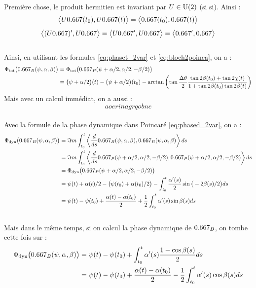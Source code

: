 Première chose, le produit hermitien est invariant par $U\in\text{\normalfont U}(2)$ (si si). Ainsi :
\[\big\langle U\x(t_0), U\x(t) \big\rangle = \big\langle \x(t_0), \x(t) \big\rangle\]
\[\big\langle (U\x)', U\x \big\rangle = \big\langle U\x', U\x \big\rangle = \big\langle \x', \x \big\rangle\]
\\
Ainsi, en utilisant les formules \eqref{eq:phaset_2var} et \eqref{eq:bloch2poinca}, on a :
\begin{align*}\phaset \big(\x_B(\psi, \alpha, \beta) \big) &= \phaset \big(\x_P(\psi + \alpha/2, \alpha/2, -\beta/2) \big) \\
	&= \big( \psi + \alpha/2 \big)(t) - \big( \psi + \alpha/2 \big)(t_0) - \arctan\left( \tan \frac{\Delta\theta}{2} \frac{ \tan 2\beta(t_0)+\tan 2\chi(t)}{1 + \tan 2\beta(t_0)\tan 2\beta(t)}\right)
\end{align*}
Mais avec un calcul immédiat, on a aussi :
\[aoerinagrqobne\]
\\
Avec la formule de la phase dynamique dans Poincaré \eqref{eq:phased_2var}, on a :
\begin{align*}
	\phased \big(\x_B(\psi, \alpha, \beta) \big) &= \Im m \int_{t_0}^t \left\langle \frac{d}{ds}\x_B(\psi, \alpha, \beta), \x_B(\psi, \alpha, \beta) \right\rangle ds \\
	&= \Im m \int_{t_0}^t \left\langle \frac{d}{ds}\x_P(\psi + \alpha/2, \alpha/2, -\beta/2), \x_P(\psi + \alpha/2, \alpha/2, -\beta/2) \right\rangle ds \\
	&= \phased \big( \x_P(\psi + \alpha/2, \alpha/2, -\beta/2) \big) \\
	&= \psi(t) + \alpha(t)/2 - \big( \psi(t_0) + \alpha(t_0)/2 \big) - \int_{t_0}^t \frac{\alpha'(s)}{2} \sin \big( -2\beta(s)/2 \big) ds \\
	&= \psi(t) - \psi(t_0) + \frac{\alpha(t) - \alpha(t_0)}{2} + \frac{1}{2} \int_{t_0}^t \alpha'(s)\sin \beta(s) ds
\end{align*}
\\
Mais dans le même temps, si on calcul la phase dynamique de $\x_B$, on tombe cette fois sur :
\begin{align*}
	\phased\big(\x_B(\psi, \alpha, \beta) \big) &= \psi(t) - \psi(t_0) +  \int_{t_0}^t \alpha'(s) \frac{1 - \cos\beta(s)}{2}ds \\
	&= \psi(t) - \psi(t_0) + \frac{\alpha(t) - \alpha(t_0)}{2}- \frac{1}{2} \int_{t_0}^t \alpha'(s) \cos\beta(s) ds 
\end{align*}
